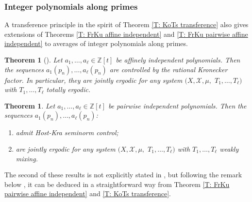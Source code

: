 \documentclass[11pt]{amsart}
\newtheorem{theorem}[lemma]{Theorem}
\theoremstyle{definition}
\newcommand{\Z}{{\mathbb Z}}
\newcommand{\CX}{{\mathcal X}}
\newcommand{\1}{{\mathbf{1}}}
\begin{document}
    \subsubsection{Integer polynomials along primes}
    A transference principle in the spirit of Theorem \ref{T: KoTs transference} also gives extensions of Theorems \ref{T: FrKu affine independent} and \ref{T: FrKu pairwise affine independent} to averages of integer polynomials along primes.
    \begin{theorem}[{\cite[Theorem 2.13]{FrKu22a}}]\label{T: FrKu affine independent along primes}
    Let $a_1, \ldots, a_\ell\in\Z[t]$ be affinely independent polynomials. Then the sequences $a_1(p_n), \ldots, a_\ell(p_n)$
    are controlled by the rational Kronecker factor. In particular, they are jointly ergodic for any system $(X, \CX, \mu,$\! $T_1, \ldots, T_\ell)$ with $T_1, \ldots, T_\ell$ totally ergodic.
\end{theorem}
\begin{theorem}\label{T: FrKu pairwise affine independent along primes}
    Let $a_1, \ldots, a_\ell\in\Z[t]$ be pairwise independent polynomials. Then the sequences $a_1(p_n), \ldots, a_\ell(p_n)$:
    \begin{enumerate}
        \item\label{i: poly primes HK seminorm control} admit Host-Kra seminorm control;
        \item\label{i: poly primes weakly mixing} are jointly ergodic for any system $(X, \CX, \mu,$\! $T_1, \ldots, T_\ell)$ with $T_1, \ldots, T_\ell$ weakly mixing.
    \end{enumerate}
\end{theorem}
The second of these results is not explicitly stated in \cite{FrKu22a}, but following the remark below \cite[Theorem 2.13]{FrKu22a}, it can be deduced in a straightforward way from Theorem \ref{T: FrKu pairwise affine independent} and \ref{T: KoTs transference}.
\end{document}
